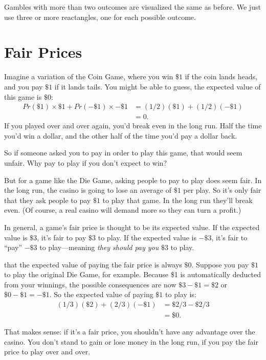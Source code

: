 \documentclass[justified]{tufte-book}
\newcommand{\p}{Pr}
\theoremstyle{definition}
\theoremstyle{definition}
\theoremstyle{definition}
\theoremstyle{definition}
\theoremstyle{remark}
\begin{document}
Gambles with more than two outcomes are visualized the same as before. We just use three or more reactangles, one for each possible outcome.

\hypertarget{fair-prices}{%
\section{Fair Prices}\label{fair-prices}}

Imagine a variation of the Coin Game, where you win \(\$1\) if the coin lands heads, and you pay \(\$1\) if it lands tails. You might be able to guess, the expected value of this game is \(\$0\):
\[
  \begin{aligned}
    \p(\$1) \times \$1 + \p(-\$1) \times -\$1 &= (1/2)(\$1) + (1/2)(-\$1)\\
      &= 0.
  \end{aligned}
\]
If you played over and over again, you'd break even in the long run. Half the time you'd win a dollar, and the other half of the time you'd pay a dollar back.

So if someone asked you to pay in order to play this game, that would seem unfair. Why pay to play if you don't expect to win?

But for a game like the Die Game, asking people to pay to play does seem fair. In the long run, the casino is going to lose an average of \(\$1\) per play. So it's only fair that they ask people to pay \(\$1\) to play that game. In the long run they'll break even. (Of course, a real casino will demand more so they can turn a profit.)

In general, a game's fair price is thought to be its expected value. If the expected value is \(\$3\), it's fair to pay \(\$3\) to play. If the expected value is \(-\$3\), it's fair to ``pay'' \(-\$3\) to play---meaning \emph{they should pay you} \(\$3\) to play.

 that the expected value of paying the fair price is always \(\$0\). Suppose you pay \(\$1\) to play the original Die Game, for example. Because \$1 is automatically deducted from your winnings, the possible consequences are now \(\$3 - \$1 = \$2\) or \(\$0 - \$1 = -\$1\). So the expected value of paying \(\$1\) to play is:
\[
  \begin{aligned}
    (1/3)(\$2) + (2/3)(-\$1) &= \$2/3 - \$2/3\\
      &= \$0.
  \end{aligned}
\]

That makes sense: if it's a fair price, you shouldn't have any advantage over the casino. You don't stand to gain or lose money in the long run, if you pay the fair price to play over and over.
\end{document}
